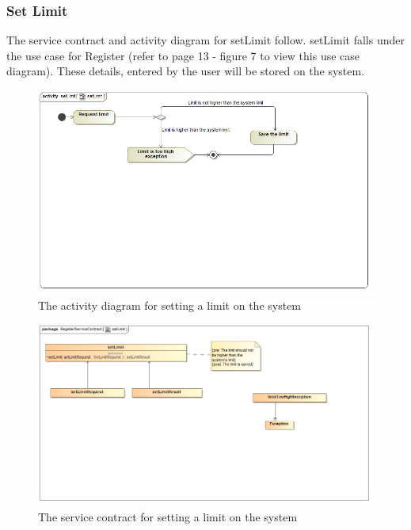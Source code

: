 \documentclass[a4paper,12pt]{report}
\begin{document}
\subsubsection{Set Limit}
The service contract and activity diagram for setLimit follow. setLimit falls under the use case for Register (refer to page 13 - figure 7 to view this use case diagram). These details, entered by the user will be stored on the system. 
\begin{figure}[H]
  \centering
    \includegraphics[width=1.0\textwidth]{../Diagrams/Register/ActivityDiagrams/setLimit.png}
    \caption{The activity diagram for setting a limit on the system} 
\end{figure}
\begin{figure}[H]
  \centering
    \includegraphics[width=1.0\textwidth]{../Diagrams/Register/ServiceContractsRegister/setLimit.png}
    \caption{The service contract for setting a limit on the system} 
\end{figure}
\end{document}
